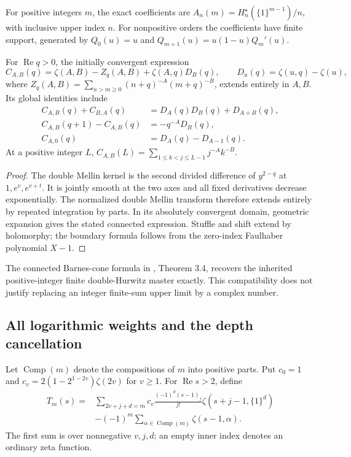 For positive integers $m$, the exact coefficients are
$A_n(m)=H_n^\star(\{1\}^{m-1})/n$, with inclusive upper index $n$.
For nonpositive orders the coefficients have finite support, generated by
$Q_0(u)=u$ and $Q_{m+1}(u)=u(1-u)Q_m'(u)$.

\begin{theorem}
\label{sdco:thm:connected}
For $\operatorname{Re}q>0$, the initially convergent expression
\[
 C_{A,B}(q)=\zeta(A,B)-Z_q(A,B)+\zeta(A,q)D_B(q),\qquad
 D_u(q)=\zeta(u,q)-\zeta(u),
\]
where $Z_q(A,B)=\sum_{n>m\ge0}(n+q)^{-A}(m+q)^{-B}$,
extends entirely in $A,B$. Its global identities include
\begin{align}
 C_{A,B}(q)+C_{B,A}(q)&=D_A(q)D_B(q)+D_{A+B}(q),\label{sdco:eq:stuffle}\\
 C_{A,B}(q+1)-C_{A,B}(q)&=-q^{-A}D_B(q),\label{sdco:eq:shift}\\
 C_{A,0}(q)&=D_A(q)-D_{A-1}(q).\label{sdco:eq:boundary}
\end{align}
At a positive integer $L$, $C_{A,B}(L)=\sum_{1\le k<j\le L-1}j^{-A}k^{-B}$.
\end{theorem}
\begin{proof}
The double Mellin kernel is the second divided difference of $y^{2-q}$
at $1,e^v,e^{v+t}$. It is jointly smooth at the two axes and all fixed
derivatives decrease exponentially. The normalized double Mellin transform
therefore extends entirely by repeated integration by parts. In its
absolutely convergent domain, geometric expansion gives the stated
connected expression. Stuffle and shift extend by holomorphy; the boundary
formula follows from the zero-index Faulhaber polynomial $X-1$.
\end{proof}

The connected Barnes-cone formula in \cite{SDCO2026}, Theorem 3.4, recovers
the inherited positive-integer finite double-Hurwitz master exactly. This
compatibility does not justify replacing an integer finite-sum upper limit
by a complex number.

\subsection{All logarithmic weights and the depth cancellation}
Let $\operatorname{Comp}(m)$ denote the compositions of $m$ into positive
parts. Put $c_0=1$ and $c_v=2(1-2^{1-2v})\zeta(2v)$ for $v\ge1$.
For $\operatorname{Re}s>2$, define
\begin{equation}\label{sdco:eq:T}
\begin{split}
 T_m(s)={}&\sum_{2v+j+d=m}
 c_v\frac{(-1)^d(s-1)_j}{j!}\zeta(s+j-1,\{1\}^d)\\
 &-(-1)^m\sum_{\alpha\in\operatorname{Comp}(m)}\zeta(s-1,\alpha).
\end{split}
\end{equation}
The first sum is over nonnegative $v,j,d$; an empty inner index denotes an
ordinary zeta function.

